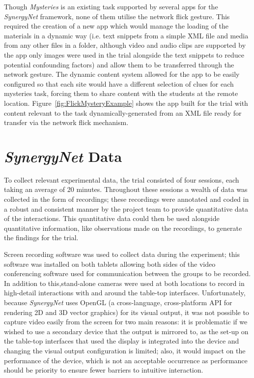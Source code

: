 \documentclass[twocolumn]{svjour3}          %
\begin{document}
Though {\emph{Mysteries}} is an existing task supported by several apps for the {\emph{SynergyNet}} framework, none of them utilise the network flick gesture.
This required the creation of a new app which would manage the loading of the materials in a dynamic way (i.e. text snippets from a simple XML file and media from any other files in a folder, although video and audio clips are supported by the app only images were used in the trial alongside the text snippets to reduce potential confounding factors) and allow them to be transferred through the network gesture.
The dynamic content system allowed for the app to be easily configured so that each site would have a different selection of clues for each mysteries task, forcing them to share content with the students at the remote location.
Figure~\ref{fig:FlickMysteryExample} shows the app built for the trial with content relevant to the task dynamically-generated from an XML file ready for transfer via the network flick mechanism.


\section{{\emph{SynergyNet}} Data} 

To collect relevant experimental data, the trial consisted of four sessions, each taking an average of 20 minutes.
Throughout these sessions a wealth of data was collected in the form of recordings; these recordings were annotated and coded in a robust and consistent manner by the project team to provide quantitative data of the interactions.
This quantitative data could then be used alongside quantitative information, like observations made on the recordings, to generate the findings for the trial.
 

Screen recording software was used to collect data during the experiment; this software was installed on both tablets allowing both sides of the video conferencing software used for communication between the groups to be recorded.
In addition to this,stand-alone cameras were used at both locations to record in high-detail interactions with and around the table-top interfaces.
Unfortunately, because {\emph{SynergyNet}} uses OpenGL (a cross-language, cross-platform API for rendering 2D and 3D vector graphics) for its visual output, it was not possible to capture video easily from the screen for two main reasons: it is problematic if we wished to use a secondary device that the output is mirrored to, as the set-up on the table-top interfaces that used the display is integrated into the device and changing the visual output configuration is limited; also, it would impact on the performance of the device, which is not an acceptable occurrence as performance should be priority to ensure fewer barriers to intuitive interaction.
\end{document}
